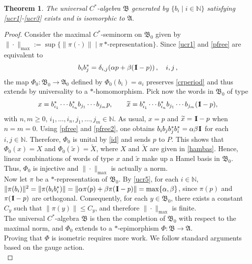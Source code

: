 \documentclass[12pt]{amsart}
\numberwithin{equation}{section}
\def\ga{{\mathfrak A}} \def\gpa{{\mathfrak a}}
\def\gb{{\mathfrak B}}\def\gpb{{\mathfrak b}}
\def\bn{{\mathbb N}}
\def\a{\alpha}
\def\b{\beta}
\def\d{\delta}  \def\D{\Delta}
\newtheorem{thm}{Theorem}[section]
\theoremstyle{definition}
\def\idd{{1}\!\!{\rm I}}
\begin{document}
\begin{thm}\label{spacefree}
The universal $C^*$-algebra $\gb$ generated by $\{b_i \mid i \in \bn\}$ satisfying \eqref{ucr1}-\eqref{ucr3} exists and is isomorphic to $\ga.$%
\end{thm}
\begin{proof}
Consider the maximal $C^*$-seminorm on $\gb_0$ given by   $\|\cdot\|_{\max}:=\sup\{\|\pi(\cdot)\|\mid \pi\, \text{$*$-representation}\}$.
Since \eqref{ucr1} and \eqref{pfree} are equivalent to
\begin{equation}\label{ucr5}
b_ib^*_j=\d_{i,j}(\a p+\b(\idd-p))\,, \quad i,j\,,
\end{equation}
the map $\Phi_0:\gb_0\rightarrow \ga_0$ defined by $\Phi_0(b_i) = a_i$ preserves \eqref{crperiod} and thus extends by universality to a $*$-homomorphism. Pick now the words in $\gb_0$ of type
\begin{equation}\label{hamuni}
x = b^*_{i_{1}} \cdots b^*_{i_{n}} b_{j_{1}} \cdots b_{j_{m}} p, \qquad
\widetilde{x} = b^*_{i_{1}} \cdots b^*_{i_{n}} b_{j_{1}} \cdots b_{j_{m}} (\idd - p),
\end{equation}
with $n,m \geq 0$, $i_1,\ldots,i_n, j_1,\ldots,j_m\in\bn$. As usual, $x=p$ and $\widetilde{x}=\idd-p$ when $n=m=0$. Using \eqref{pfree} and \eqref{pfree2}, one obtains $b_i b_j b_j^* b_i^* = \a \b \idd$ for each $i,j\in\bn$. Therefore, $\Phi_0$ is unital by \eqref{id} and sends $p$ to $P$. This shows that $\Phi_0(x)=X$ and $\Phi_0(\widetilde{x})=\widetilde{X}$, where $X$ and $\widetilde{X}$ are given in \eqref{hambas}.  Hence, linear combinations of words of type $x$ and $\widetilde{x}$ make up a Hamel basis in $\gb_0$. Thus, $\Phi_0$ is injective and $\|\cdot\|_{\max}$ is actually a norm. \\
Now let $\pi$ be a $*$-representation of $\gb_0$. By \eqref{ucr5}, for each $i\in\bn$, $\|\pi(b_i)\|^2=\|\pi(b_ib_i^*)\|= \|\a \pi(p)+ \b\pi(\idd-p)\|=\max\{\a,\b\}$, since $\pi(p)$ and $\pi(\idd-p)$ are orthogonal. Consequently, for each $y\in\gb_0$, there exists a constant $C_y$ such that $\|\pi(y)\|\leq C_y$, and therefore $\|\cdot\|_{\max}$ is finite.\\
The universal $C^*$-algebra $\gb$ is then the completion of $\gb_0$ with respect to the maximal norm, and $\Phi_0$ extends to a $*$-epimorphism $\Phi: \gb \to \ga$.\\
Proving that $\Phi$ is isometric requires more work. We follow standard arguments based on the gauge action.\\

\end{proof}
\end{document}
